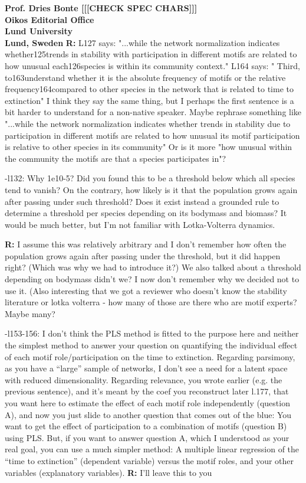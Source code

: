 \documentclass[12pt]{letter}
\begin{document}
\begin{letter}{\bf Prof. Dries Bonte [[[CHECK SPEC CHARS]]]\\
Oikos Editorial Office \\
Lund University \\
Lund, Sweden}
    \textbf{R:}
    L127 says: "...while the network normalization indicates whether125trends in stability with participation in different motifs are related to how unusual each126species is within its community context." L164 says: " Third, to163understand whether it is the absolute frequency of motifs or the relative frequency164compared to other species in the network that is related to time to extinction" I think they say the same thing, but I perhaps the first sentence is a bit harder to understand for a non-native speaker. Maybe rephrase something like "...while the network normalization indicates whether trends in stability due to participation in different motifs are related to how unusual its motif participation is relative to other species in its community" Or is it more "how unusual within the community the motifs are that a species participates in"?

    -l132: Why 1e10-5? Did you found this to be a threshold below which all species tend to vanish? On the contrary, how likely is it that the population grows again after passing under such threshold? Does it exist instead a grounded rule to determine a threshold per species depending on its bodymass and biomass? It would be much better, but I’m not familiar with Lotka-Volterra dynamics.

    \textbf{R:}
    I assume this was relatively arbitrary and I don't remember how often the population grows again after passing under the threshold, but it did happen right? (Which was why we had to introduce it?) We also talked about a threshold depending on bodymass didn't we? I now don't remember why we decided not to use it. (Also interesting that we got a reviewer who doesn't know the stability literature or lotka volterra - how many of those are there who are motif experts? Maybe many?

    -l153-156:  I don’t think the PLS method is fitted to the purpose here and neither the simplest method to answer your question on quantifying the individual effect of each motif role/participation on the time to extinction. Regarding parsimony, as you have a “large” sample of networks, I don’t see a need for a latent space with reduced dimensionality. Regarding relevance, you wrote earlier (e.g. the previous sentence), and it’s meant by the coef you reconstruct later l.177, that you want here to estimate the effect of each motif role independently (question A), and now you just slide to another question that comes out of the blue: You want to get the effect of participation to a combination of motifs (question B) using PLS. But, if you want to answer question A, which I understood as your real goal, you can use a much simpler method: A multiple linear regression of the “time to extinction” (dependent variable) versus the motif roles, and your other variables (explanatory variables).
    \textbf{R:}
    I'll leave this to you


\end{letter}
\end{document}
